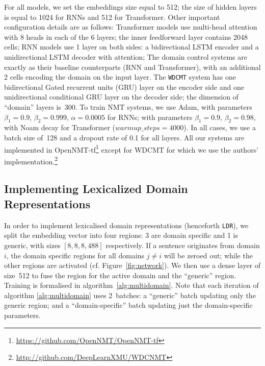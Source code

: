 \documentclass[a4paper]{article}
\newcommand{\fyDone}[1]{\done[FY]\Todo[FY:]{\textcolor{orange}{#1}}}
\begin{document}
For all models, we set the embeddings size equal to 512; the size of hidden layers is equal to 1024 for RNNs and 512 for Transformer. 
Other important configuration details are as follows:
Transformer models use multi-head attention with 8 heads in each of the 6 layers; 
the inner feedforward layer contains 2048 cells;  
RNN models use 1 layer on both sides: 
a bidirectional LSTM encoder and a unidirectional LSTM decoder with attention;
The domain control systems are exactly as their baseline counterparts (RNN and Transformer), with an additional 2 cells encoding the domain on the input layer.
The \texttt{WDCMT} system has one bidirectional Gated recurrent units (GRU) layer on the encoder side and one unidirectional conditional GRU layer on the decoder side; the dimension of ``domain'' layers is~300.
%
To train NMT systems, we use Adam, with parameters $\beta_1=0.9$, $\beta_2 = 0.999$, $\alpha=0.0005$ for RNNs; with parameters $\beta_1=0.9$, $\beta_2= 0.98$, with Noam decay \cite{Vaswani17attention} for Transformer ($warmup\_steps=4000$). In all cases, we use a batch size of~128 and a dropout rate of 0.1 for all layers. 
All our systems are implemented in OpenNMT-tf\footnote{\url{https://github.com/OpenNMT/OpenNMT-tf}} \cite{Klein17opennmt} except for WDCMT for which we use the authors' implementation.\footnote{\noindent\url{http://github.com/DeepLearnXMU/WDCNMT}}\fyDone{batch size}

\subsection{Implementing Lexicalized Domain Representations}\fyDone{Check acronym.}

\fyDone{Motivate the split - discuss experimentally embedding size}
In order to implement lexicalised domain representations (henceforth \texttt{LDR}), we split the embedding vector into four regions: 
3 are domain specific and 1 is generic, with sizes $[8,8,8,488]$ respectively. %
If a sentence originates from domain $i$, the domain specific regions for all domains $j \neq i$ will be zeroed out; while the other regions are activated (cf. Figure~\ref{fig:network}). 
We then use a dense layer of size~512 to fuse the region for the active domain and the ``generic'' region. Training is formalised in algorithm~\ref{alg:multidomain}.
%
Note that each iteration of algorithm \ref{alg:multidomain} uses 2~batches: a ``generic'' batch updating only the generic region; and a ``domain-specific'' batch updating just the domain-specific parameters. 
\end{document}
